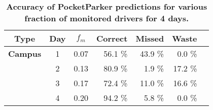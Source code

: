 \begin{table}[t]
\begin{threeparttable}
{\small
\begin{tabularx}{\columnwidth}{Xccrrrr}
\multicolumn{1}{c}{\textbf{Type}} & 
\multicolumn{1}{c}{\textbf{Day}} & 
\multicolumn{1}{c}{\textbf{$f_m$}} & 
\multicolumn{1}{c}{\textbf{Correct}} & 
\multicolumn{1}{c}{\textbf{Missed}} & 
\multicolumn{1}{c}{\textbf{Waste}}\\ \toprule

\textbf{Campus} & 1 & 0.07 & 56.1 \% & 43.9 \% & 0.0 \% \\
& 2 & 0.13 & 80.9 \% & 1.9 \% & 17.2 \% \\
& 3 & 0.17 & 72.4 \% & 11.0 \% & 16.6 \% \\
& 4 & 0.20 & 94.2 \% & 5.8 \% & 0.0 \% \\
\end{tabularx}
}
\caption{\textbf{Accuracy of PocketParker predictions for various fraction of monitored drivers for 4 days.}}
\label{table-accuracy}
\end{threeparttable}
\end{table}
